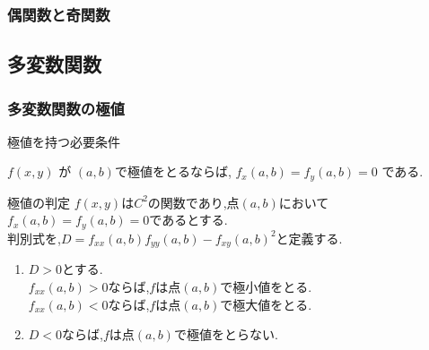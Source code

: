 \documentclass[a4paper]{jsarticle}
\begin{document}
\subsubsection{偶関数と奇関数}
\subsection{多変数関数}
\subsubsection{多変数関数の極値}
\begin{itembox}[l]{極値を持つ必要条件}
    \begin{center}
        $f\left(x,y\right)$ が $\left(a,b\right)$で極値をとるならば,
        $f_x\left(a,b\right)=f_y\left(a,b\right)=0$ である.
    \end{center}
\end{itembox}
\begin{itembox}[l]{極値の判定}
    $f\left(x,y\right)$は$C^2$の関数であり,点$\left(a,b\right)$において
    $f_x\left(a,b\right)=f_y\left(a, b\right)=0$であるとする.\\
    判別式を,$D=f_{xx}\left(a,b\right)f_{yy}\left(a,b\right)-{f_{xy}(a,b)}^2$と定義する.
    \begin{enumerate}[(1)]
        \item $D>0$とする.\\
              $f_{xx}\left(a,b\right)>0$ならば,$f$は点$\left(a,b\right)$で極小値をとる.\\
              $f_{xx}\left(a,b\right)<0$ならば,$f$は点$\left(a,b\right)$で極大値をとる.
        \item $D<0$ならば,$f$は点$\left(a,b\right)$で極値をとらない.
    \end{enumerate}
\end{itembox}
\end{document}
